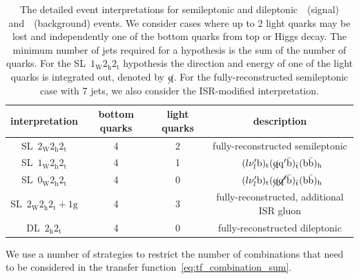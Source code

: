 \begin{table}[h!]
\begin{center}
\begin{tabular}{c|ccc}
\hline
interpretation & bottom quarks & light quarks & description \\
\hline
SL~$2_{\mathrm{W}} 2_{\mathrm{h}} 2_{\mathrm{t}}$ & 4 & 2 & fully-reconstructed semileptonic \\
SL~$1_{\mathrm{W}} 2_{\mathrm{h}} 2_{\mathrm{t}}$ & 4 & 1 &~$(l \nu_{l}' \mathrm{b})_{\mathrm{t}} (\cancel{\mathrm{q}} \mathrm{q}' \bar{\mathrm{b}})_{\bar{\mathrm{t}}} (\mathrm{b} \bar{\mathrm{b}})_{\mathrm{h}}$ \\
SL~$0_{\mathrm{W}} 2_{\mathrm{h}} 2_{\mathrm{t}}$ & 4 & 0 &~$(l \nu_{l}' \mathrm{b})_{\mathrm{t}} (\cancel{\mathrm{q}} \cancel{\mathrm{q}'} \bar{\mathrm{b}})_{\bar{\mathrm{t}}} (\mathrm{b} \bar{\mathrm{b}})_{\mathrm{h}}$ \\
SL~$2_{\mathrm{W}} 2_{\mathrm{h}} 2_{\mathrm{t}}+1\mathrm{g}$ & 4 & 3 & fully-reconstructed, additional ISR gluon \\
\hline
DL~$2_{\mathrm{h}} 2_{\mathrm{t}}$ & 4 & 0 & fully-reconstructed dileptonic \\
\hline
\hline
\end{tabular}
\caption[The MEM event interpretations considered for different final state topologies]{The detailed event interpretations for semileptonic and dileptonic~\ttH~(signal) and~\ttbb~(background) events. We consider cases where up to 2 light quarks may be lost and independently one of the bottom quarks from top or Higgs decay. The minimum number of jets required for a hypothesis is the sum of the number of quarks. For the SL~$1_{\mathrm{W}} 2_{\mathrm{h}} 2_{\mathrm{t}}$ hypothesis the direction and energy of one of the light quarks is integrated out, denoted by $\cancel{\mathrm{q}}$. For the fully-reconstructed semileptonic case with 7 jets, we also consider the ISR-modified interpretation.}
\label{tab:event_interpretation_list}
\end{center}
\end{table}
We use a number of strategies to restrict the number of combinations that need to be considered in the transfer function~\cref{eq:tf_combination_sum}. 


